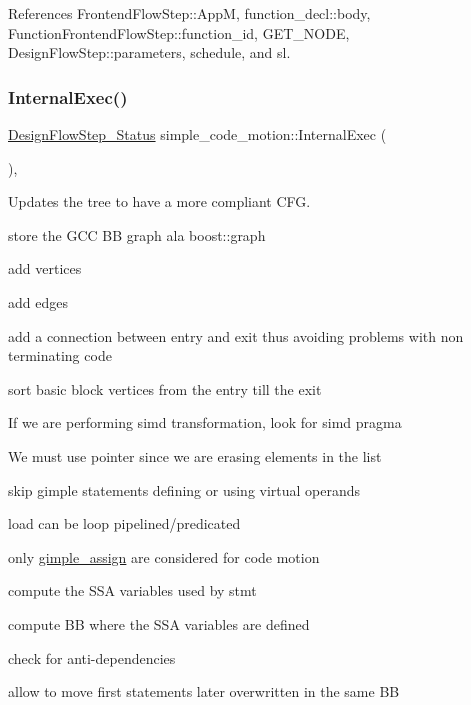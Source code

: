 References Frontend\+Flow\+Step\+::\+AppM, function\+\_\+decl\+::body, Function\+Frontend\+Flow\+Step\+::function\+\_\+id, G\+E\+T\+\_\+\+N\+O\+DE, Design\+Flow\+Step\+::parameters, schedule, and sl.

\mbox{\label{classsimple__code__motion_ada1641b8154a93dd9ea23bb778b8e059}} 
\subsubsection{\texorpdfstring{Internal\+Exec()}{InternalExec()}}
{\footnotesize\ttfamily \hyperlink{design__flow__step_8hpp_afb1f0d73069c26076b8d31dbc8ebecdf}{Design\+Flow\+Step\+\_\+\+Status} simple\+\_\+code\+\_\+motion\+::\+Internal\+Exec (\begin{DoxyParamCaption}{ }\end{DoxyParamCaption})\hspace{0.3cm}{\ttfamily [override]}, {\ttfamily [virtual]}}



Updates the tree to have a more compliant C\+FG. 

store the G\+CC BB graph ala boost\+::graph

add vertices

add edges

add a connection between entry and exit thus avoiding problems with non terminating code

sort basic block vertices from the entry till the exit

If we are performing simd transformation, look for simd pragma

We must use pointer since we are erasing elements in the list

skip gimple statements defining or using virtual operands

load can be loop pipelined/predicated

only \hyperlink{structgimple__assign}{gimple\+\_\+assign} are considered for code motion

compute the S\+SA variables used by stmt

compute BB where the S\+SA variables are defined

check for anti-\/dependencies

allow to move first statements later overwritten in the same BB

